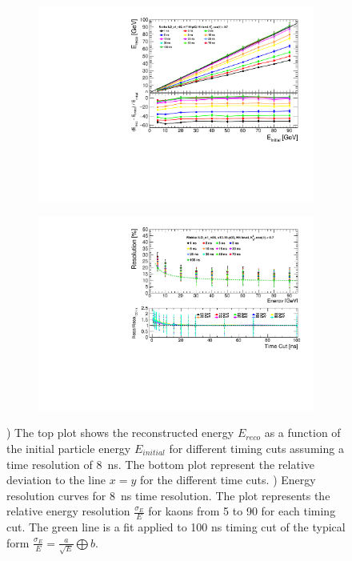 \begin{figure}[htbp!]
  \centering
  \begin{subfigure}[t]{0.49\textwidth}
    \centering
    \includegraphics[width=1\linewidth]{../Thesis_Plots/ILD/Smearing_8ns/Plots/Linearity_TimeCuts_Smearing3}
    \caption{} \label{fig:Lin8ns}
  \end{subfigure}
  \hfill
  \begin{subfigure}[t]{0.49\textwidth}
    \centering
    \includegraphics[width=1\linewidth]{../Thesis_Plots/ILD/Smearing_8ns/Plots/ShowerResoAbsolute_TimeCuts_Smearing3}
    \caption{} \label{fig:Reso8ns}
  \end{subfigure}
  \caption{) The top plot shows the reconstructed energy $E_{reco}$ as a function of the initial particle energy $E_{initial}$ for different timing cuts assuming a time resolution of \SI{8}{\nano\second}. The bottom plot represent the relative deviation to the line $x=y$ for the different time cuts. ) Energy resolution curves for \SI{8}{\nano\second} time resolution. The plot represents the relative energy resolution $\frac{\sigma_{E}}{E}$ for kaons from 5 to 90 \GeV for each timing cut. The green line is a fit applied to 100 ns timing cut of the typical form $\frac{\sigma_{E}}{E} = \frac{a}{\sqrt{E}} \bigoplus b$.}
\end{figure}

